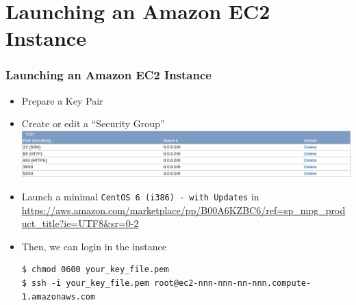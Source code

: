 \documentclass{beamer}
\begin{document}
\section{Launching an Amazon EC2 Instance}
\begin{frame}
\frametitle{Launching an Amazon EC2 Instance}

\begin{itemize}
\item Prepare a Key Pair
\item Create or edit a ``Security Group'' \includegraphics[width=1.0 \textwidth]{securitygroup.eps}
\item Launch a minimal \texttt{CentOS 6 (i386) - with Updates} in \url{https://aws.amazon.com/marketplace/pp/B00A6KZBC6/ref=sp_mpg_product_title?ie=UTF8&sr=0-2}
\item Then, we can login in the instance

\lstset{language=shell, escapechar=!}
\begin{lstlisting}[escapechar=!]
$ chmod 0600 your_key_file.pem 
$ ssh -i your_key_file.pem root@ec2-nnn-nnn-nn-nnn.compute-1.amazonaws.com
\end{lstlisting}

\end{itemize}

\end{frame}






\end{document}
